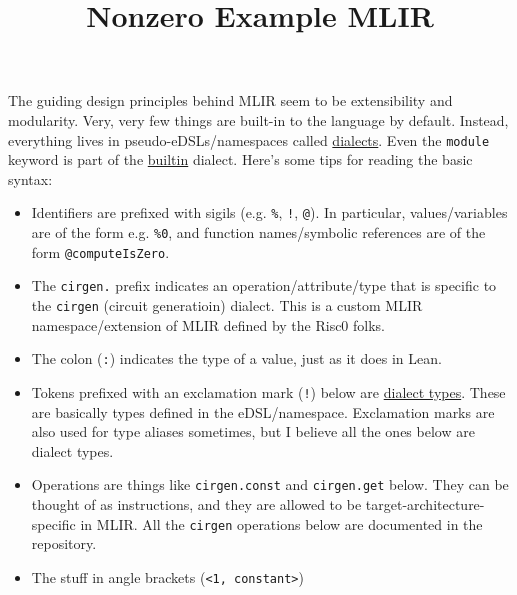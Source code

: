 \documentclass[10pt, reqno]{amsart}
\begin{document}
\title{Nonzero Example MLIR}
\author{}

\maketitle

The guiding design principles behind MLIR seem to be extensibility and modularity. Very, very few things are built-in to the language by default. Instead, everything lives in pseudo-eDSLs/namespaces called \href{https://mlir.llvm.org/docs/LangRef/#dialects}{dialects}. Even the \texttt{module} keyword is part of the \href{https://mlir.llvm.org/docs/Dialects/Builtin/}{builtin} dialect. Here's some tips for reading the basic syntax:
\begin{itemize}
  \item Identifiers are prefixed with sigils (e.g. \texttt{\%}, \texttt{!}, \texttt{@}). In particular, values/variables are of the form e.g. \texttt{\%0}, and function names/symbolic references are of the form \texttt{@computeIsZero}.
  \item The \texttt{cirgen.} prefix indicates an operation/attribute/type that is specific to the \texttt{cirgen} (circuit generatioin) dialect. This is a custom MLIR namespace/extension of MLIR defined by the Risc0 folks.
  \item The colon (\texttt{:}) indicates the type of a value, just as it does in Lean.
  \item Tokens prefixed with an exclamation mark (\texttt{!}) below are \href{https://mlir.llvm.org/docs/LangRef/#dialect-types}{dialect types}. These are basically types defined in the eDSL/namespace. Exclamation marks are also used for type aliases sometimes, but I believe all the ones below are dialect types.
  \item Operations are things like \texttt{cirgen.const} and \texttt{cirgen.get} below. They can be thought of as instructions, and they are allowed to be target-architecture-specific in MLIR. All the \texttt{cirgen} operations below are documented in the repository.
  \item The stuff in angle brackets (\texttt{<1, constant>})
\end{itemize}
\end{document}
